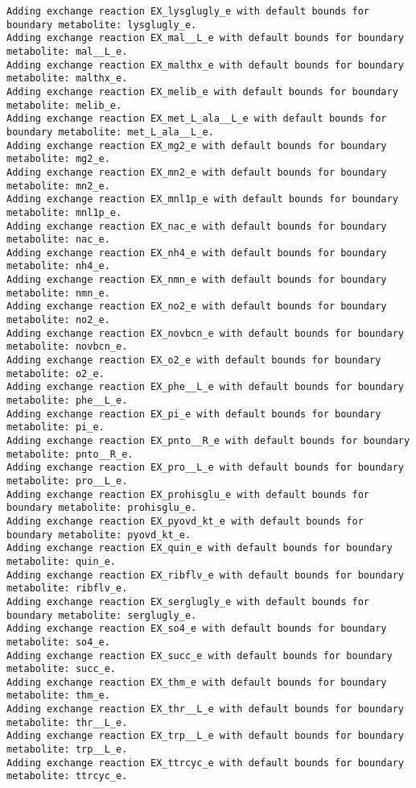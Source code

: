 \documentclass[
  letterpaper,
  DIV=11,
  numbers=noendperiod]{scrartcl}
\begin{document}
\begin{verbatim}
Adding exchange reaction EX_lysglugly_e with default bounds for boundary metabolite: lysglugly_e.
Adding exchange reaction EX_mal__L_e with default bounds for boundary metabolite: mal__L_e.
Adding exchange reaction EX_malthx_e with default bounds for boundary metabolite: malthx_e.
Adding exchange reaction EX_melib_e with default bounds for boundary metabolite: melib_e.
Adding exchange reaction EX_met_L_ala__L_e with default bounds for boundary metabolite: met_L_ala__L_e.
Adding exchange reaction EX_mg2_e with default bounds for boundary metabolite: mg2_e.
Adding exchange reaction EX_mn2_e with default bounds for boundary metabolite: mn2_e.
Adding exchange reaction EX_mnl1p_e with default bounds for boundary metabolite: mnl1p_e.
Adding exchange reaction EX_nac_e with default bounds for boundary metabolite: nac_e.
Adding exchange reaction EX_nh4_e with default bounds for boundary metabolite: nh4_e.
Adding exchange reaction EX_nmn_e with default bounds for boundary metabolite: nmn_e.
Adding exchange reaction EX_no2_e with default bounds for boundary metabolite: no2_e.
Adding exchange reaction EX_novbcn_e with default bounds for boundary metabolite: novbcn_e.
Adding exchange reaction EX_o2_e with default bounds for boundary metabolite: o2_e.
Adding exchange reaction EX_phe__L_e with default bounds for boundary metabolite: phe__L_e.
Adding exchange reaction EX_pi_e with default bounds for boundary metabolite: pi_e.
Adding exchange reaction EX_pnto__R_e with default bounds for boundary metabolite: pnto__R_e.
Adding exchange reaction EX_pro__L_e with default bounds for boundary metabolite: pro__L_e.
Adding exchange reaction EX_prohisglu_e with default bounds for boundary metabolite: prohisglu_e.
Adding exchange reaction EX_pyovd_kt_e with default bounds for boundary metabolite: pyovd_kt_e.
Adding exchange reaction EX_quin_e with default bounds for boundary metabolite: quin_e.
Adding exchange reaction EX_ribflv_e with default bounds for boundary metabolite: ribflv_e.
Adding exchange reaction EX_serglugly_e with default bounds for boundary metabolite: serglugly_e.
Adding exchange reaction EX_so4_e with default bounds for boundary metabolite: so4_e.
Adding exchange reaction EX_succ_e with default bounds for boundary metabolite: succ_e.
Adding exchange reaction EX_thm_e with default bounds for boundary metabolite: thm_e.
Adding exchange reaction EX_thr__L_e with default bounds for boundary metabolite: thr__L_e.
Adding exchange reaction EX_trp__L_e with default bounds for boundary metabolite: trp__L_e.
Adding exchange reaction EX_ttrcyc_e with default bounds for boundary metabolite: ttrcyc_e.

\end{verbatim}
\end{document}
